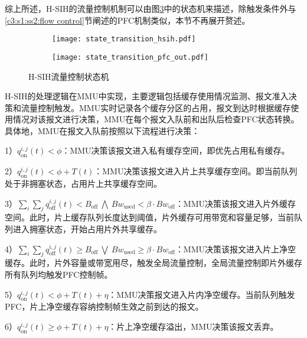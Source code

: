 综上所述，H-SIH的流量控制机制可以由图\ref{c4:s1:ss1:fig:hsih state transition}中的状态机来描述，除触发条件外与\ref{c3:s1:ss2:flow control}节阐述的PFC机制类似，本节不再展开赘述。
\begin{figure}[H]
  \begin{subfigure}[b]{0.49\linewidth}
      \centering
      \texttt{[image: state\_transition\_hsih.pdf]}
      \label{c3:s3:ss4:fig:sub1:hsih ingress queue state transition}
  \end{subfigure}
  \begin{subfigure}[b]{0.49\linewidth}
      \centering
      \texttt{[image: state\_transition\_pfc\_out.pdf]}
      \label{c3:s3:ss4:fig:sub2:hsih egress queue state transition}
  \end{subfigure}
  \caption{H-SIH流量控制状态机}
  \label{c4:s1:ss1:fig:hsih state transition}
\end{figure}


H-SIH的处理逻辑在MMU中实现，主要逻辑包括缓存使用情况监测、报文准入决策和流量控制触发。MMU实时记录各个缓存分区的占用，报文到达时根据缓存使用情况对该报文进行决策，MMU在每个报文入队前和出队后检查PFC状态转换。具体地，MMU在报文入队前按照以下流程进行决策：

1）$q^{i,j}_{\text{on}}(t)<\phi$：MMU决策该报文进入私有缓存空间，即优先占用私有缓存。

2）$q^{i,j}_{\text{on}}(t)< \phi+T(t)$：MMU决策该报文进入片上共享缓存空间。即当前队列处于非拥塞状态，占用片上共享缓存空间。

3）$\sum_{i}\sum_{j}q^{i,j}_{\text{off}}(t) < B_{\text{off}} ~\bigwedge~ Bw_{\text{used}} < \beta \cdot Bw_{\text{off}}$：MMU决策该报文进入片外缓存空间。此时，片上缓存队列长度达到阈值，片外缓存可用带宽和容量足够，当前队列进入拥塞状态，开始占用片外共享缓存。

4）$\sum_{i}\sum_{j}q^{i,j}_{\text{off}}(t) \geqslant B_{\text{off}} ~\bigvee~ Bw_{\text{used}} \geqslant \beta \cdot Bw_{\text{off}}$：MMU决策该报文进入片上净空缓存。此时，片外容量或带宽用尽，触发全局流量控制，全局流量控制即片外缓存所有队列均触发PFC控制帧。

5）$q^{i,j}_{\text{on}}(t) < \phi +T(t)+\eta$：MMU决策报文进入片内净空缓存。当前队列触发PFC，片上净空缓存容纳控制帧生效之前到达的报文。

6）$q^{i,j}_{\text{on}}(t) \geqslant \phi +T(t)+\eta$：片上净空缓存溢出，MMU决策该报文丢弃。


